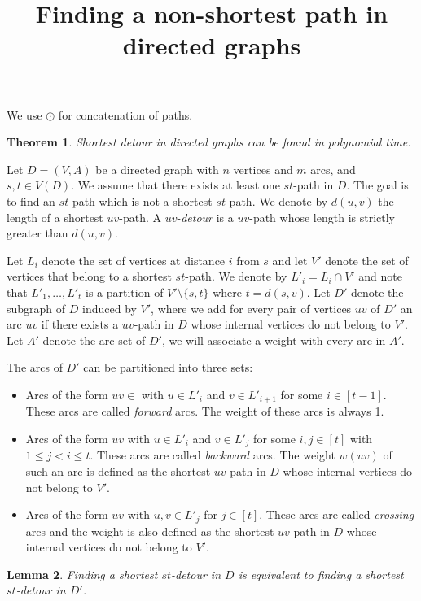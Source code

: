 \documentclass[utf8,11pt]{article}
\title{Finding a non-shortest path in directed graphs}
\author{}
\date{}
\theoremstyle{plain}
\newtheorem{theorem}{Theorem}
\newtheorem{lemma}[theorem]{Lemma}
\theoremstyle{definition}
\begin{document}
\maketitle 

We use $\odot$ for concatenation of paths.

\begin{theorem}\label{proof:main} 
    Shortest detour in directed graphs can be found in polynomial time. 
\end{theorem}

Let $D = (V,A)$ be a directed graph with $n$ vertices and $m$ arcs, and $s,t \in V(D)$. We assume that there exists at least one $st$-path in $D$. The goal is to find an $st$-path which is not a shortest $st$-path. We denote by $d(u,v)$ the length of a shortest $uv$-path. A $uv$-\textit{detour} is a $uv$-path whose length is strictly greater than $d(u,v)$.

Let $L_i$ denote the set of vertices at distance $i$ from $s$ and let $V'$ denote the set of vertices that belong to a shortest $st$-path. We denote by $L'_i = L_i \cap V'$ and note that $L'_1, \dots, L'_t$ is a partition of $V' \setminus \{s,t\}$ where $t = d(s,v)$. Let $D'$ denote the subgraph of $D$ induced by $V'$, where we add for every pair of vertices $uv$ of $D'$ an arc $uv$ if there exists a $uv$-path in $D$ whose internal vertices do not belong to $V'$. Let $A'$ denote the arc set of $D'$, we will associate a weight with every arc in $A'$. 

The arcs of $D'$ can be partitioned into three sets: 
\begin{itemize}
    \item Arcs of the form $uv \in$ with $u \in L'_{i}$ and $v \in L'_{i+1}$ for some $i \in [t-1]$. These arcs are called \textit{forward} arcs. The weight of these arcs is always 1.
    \item Arcs of the form $uv$ with $u \in L'_{i}$ and $v \in L'_{j}$ for some $i,j \in [t]$ with $1 \leq j < i \leq t$. These arcs are called \textit{backward} arcs. The weight $w(uv)$ of such an arc is defined as the shortest $uv$-path in $D$ whose internal vertices do not belong to $V'$. 
    \item Arcs of the form $uv$ with $u,v \in L'_{j}$ for $j \in [t]$. These arcs are called \textit{crossing} arcs and the weight is also defined as the shortest $uv$-path in $D$ whose internal vertices do not belong to $V'$.
\end{itemize}

\begin{lemma}
    Finding a shortest $st$-detour in $D$ is equivalent to finding a shortest $st$-detour in $D'$.
\end{lemma}
\end{document}
